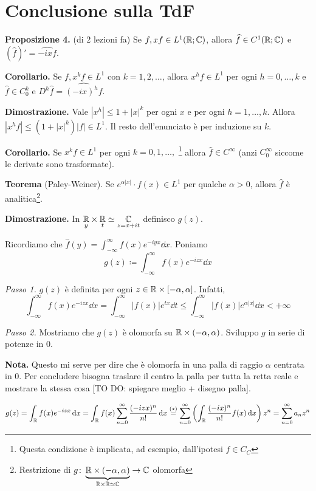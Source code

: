 \section{Conclusione sulla TdF}

\textbf{Proposizione 4.} (di 2 lezioni fa)
Se $f,xf \in L^1(\mathbb R;\mathbb C)$, allora $\widehat{f} \in C^1(\mathbb R;\mathbb C)$ e $(\hat{f})' = \hat{-ixf}$.

\textbf{Corollario.} Se $f,x^kf \in L^1$ con $k=1,2,\ldots$, allora $x^hf \in L^1$ per ogni $h=0,\ldots,k$ e $\hat{f} \in C_0^k$ e $D^h \hat{f} = \hat{(-ix)^h f}$.

\textbf{Dimostrazione.} Vale $|x^h| \leq 1 + |x|^k$ per ogni $x$ e per ogni $h=1,\ldots,k$.
Allora $|x^hf| \leq (1 + |x|^k)|f| \in L^1$.
Il resto dell'enunciato è per induzione su $k$.

\vs

\textbf{Corollario.} Se $x^k f \in L^1$ per ogni $k=0,1,\ldots,$ \footnote{Questa condizione è implicata, ad esempio, dall'ipotesi $f \in C_C$} allora $\hat{f} \in C^\infty$ (anzi $C_0^\infty$ siccome le derivate sono trasformate).

\vs

\textbf{Teorema} (Paley-Weiner).
Se $e^{\alpha |x|} \cdot f(x) \in L^1$ per qualche $\alpha > 0$, allora $\hat{f}$ è analitica\footnote{Restrizione di $g \colon \underbrace{\mathbb R \times (-\alpha,\alpha)}_{\mathbb R \times \mathbb R \simeq \mathbb C} \to \mathbb C$ olomorfa}.

\textbf{Dimostrazione.} In $\underset{y}{\mathbb R} \times \underset{t}{\mathbb R} \simeq \underset{z=x+it}{\mathbb C}$ definisco $g(z)$.

Ricordiamo che $\hat{f}(y) = \int_{-\infty}^\infty f(x) e^{-iyx} \dd x $.
Poniamo
%
$$
	g(z) \coloneqq \int_{-\infty}^\infty f(x) e^{-izx} \dd x 
$$
%

\textit{Passo 1.} $g(z)$ è definita per ogni $z \in \mathbb R \times [-\alpha,\alpha]$.
Infatti,
%
$$
	\int_{-\infty}^\infty f(x) e^{-izx} \dd x 
	= \int_{-\infty}^\infty |f(x)| e^{tx} \dd t
	\leq \int_{-\infty}^\infty |f(x)| e^{\alpha |x|} \dd x < +\infty
$$
%

\textit{Passo 2.} Mostriamo che $g(z)$ è olomorfa su $\mathbb R \times (-\alpha,\alpha)$.
Sviluppo $g$ in serie di potenze in $0$.

\textbf{Nota.} Questo mi serve per dire che è olomorfa in una palla di raggio $\alpha $ centrata in $0$. Per concludere bisogna traslare il centro la palla per tutta la retta reale e mostrare la stessa cosa [TO DO: spiegare meglio + disegno palla].

%
$$
	g(z) = \int_\mathbb R f(x) e^{-izx} \,\mathrm{d} x 
	= \int_\mathbb R f(x) \sum_{n=0}^\infty \frac{(-izx)^n}{n!} \,\mathrm{d} x
	\overset{(\star)}{=} \sum_{n=0}^{\infty} \left( \int_\mathbb R \frac{(-ix)^n}{n!} f(x) \,\mathrm{d} x \right) z^n
	= \sum_{n=0}^\infty a_n z^n
$$
%

